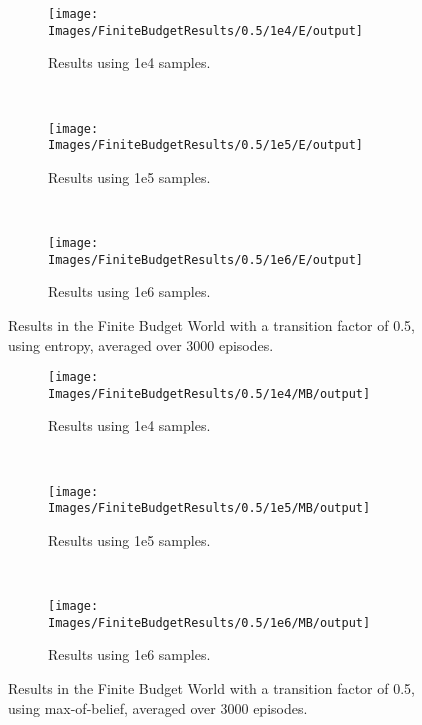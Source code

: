 \begin{figure}[ht]
        \centering
        \begin{subfigure}[t]{0.3\textwidth}
                \texttt{[image: Images/FiniteBudgetResults/0.5/1e4/E/output]}
                \caption{Results using 1e4 samples.}
                \label{fig:fb4e5}
        \end{subfigure}%
        ~ %
        \begin{subfigure}[t]{0.3\textwidth}
                \texttt{[image: Images/FiniteBudgetResults/0.5/1e5/E/output]}
                \caption{Results using 1e5 samples.}
                \label{fig:fb5e5}
        \end{subfigure}
        ~ %
        \begin{subfigure}[t]{0.3\textwidth}
                \texttt{[image: Images/FiniteBudgetResults/0.5/1e6/E/output]}
                \caption{Results using 1e6 samples.}
                \label{fig:fb6e5}
        \end{subfigure}
        \caption{Results in the Finite Budget World with a transition factor of 0.5, using entropy, averaged over 3000 episodes.}
        \label{ref:fbentropyfig5}
\end{figure}

\begin{figure}[ht]
        \centering
        \begin{subfigure}[t]{0.3\textwidth}
                \texttt{[image: Images/FiniteBudgetResults/0.5/1e4/MB/output]}
                \caption{Results using 1e4 samples.}
                \label{fig:fb4m5}
        \end{subfigure}%
        ~ %
        \begin{subfigure}[t]{0.3\textwidth}
                \texttt{[image: Images/FiniteBudgetResults/0.5/1e5/MB/output]}
                \caption{Results using 1e5 samples.}
                \label{fig:fb5m5}
        \end{subfigure}
        ~ %
        \begin{subfigure}[t]{0.3\textwidth}
                \texttt{[image: Images/FiniteBudgetResults/0.5/1e6/MB/output]}
                \caption{Results using 1e6 samples.}
                \label{fig:fb6m5}
        \end{subfigure}
        \caption{Results in the Finite Budget World with a transition factor of 0.5, using max-of-belief, averaged over 3000 episodes.}
        \label{ref:fbmbfig5}
\end{figure}


